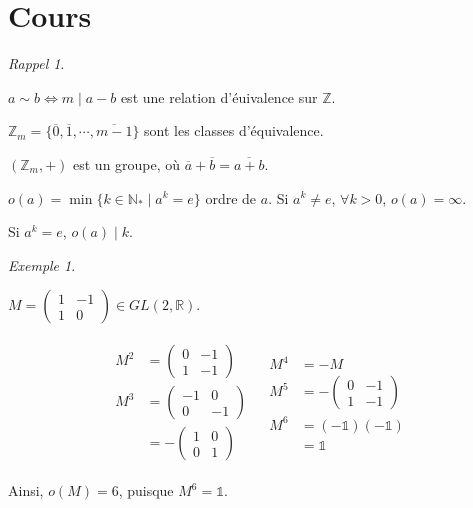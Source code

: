 \documentclass{report}
\newcounter{cours}
\newcommand*{\cours}{\section*{Cours \thecours}\stepcounter{cours}}
\newcommand*{\reels}{\mathbb{R}}
\newcommand*{\entiers}{\mathbb{Z}}
\newcommand*{\naturels}{\mathbb{N}}
\theoremstyle{definition}
\theoremstyle{remark}
\newtheorem*{exem}{Exemple}
\newtheorem*{rappel}{Rappel}
\begin{document}
	\cours
	\begin{rappel}
		~

		\begin{ulist}
			\item $a \sim b \Leftrightarrow m \mid a-b$ est une relation d'\'euivalence sur $\entiers$.
			\item $\entiers_m = \{\overline0, \overline1, \dotsb, \overline{m-1}\}$ sont les classes d'\'equivalence.
			\item $(\entiers_m, +)$ est un groupe, o\`u $\overline{a} + \overline{b} = \overline{a+b}$.
			\item $o(a) = \min\{k \in \naturels_* \mid a^k = e\}$ ordre de $a$. Si $a^k \neq e$, $\forall k>0$, $o(a)=\infty$.
			\item Si $a^k=e$, $o(a) \mid k$.
		\end{ulist}
	\end{rappel}
	\begin{exem}
		~

		$M=\begin{pmatrix}
			1&-1\\1&0
		\end{pmatrix} \in GL(2, \reels)$.

		\begin{align*}
			\begin{split}
				M^2&= \begin{pmatrix}
					0&-1\\1&-1
				\end{pmatrix}\\
				M^3&= \begin{pmatrix}
					-1&0\\0&-1
				\end{pmatrix}\\
				&= -\begin{pmatrix}
					1&0\\0&1
				\end{pmatrix}
			\end{split}
			&
			\begin{split}
				M^4&= -M\\
				M^5&= -\begin{pmatrix}
					0&-1\\1&-1
				\end{pmatrix}\\
				M^6&= (-\mathds{1})(-\mathds{1})\\
				&= \mathds{1}
			\end{split}
		\end{align*}

		Ainsi, $o(M) = 6$, puisque $M^6=\mathds{1}$.
	\end{exem}
\end{document}
